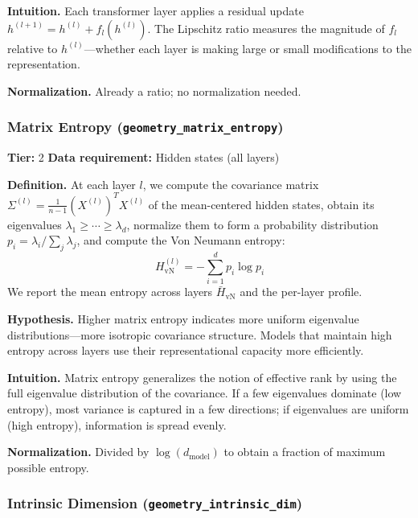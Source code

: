 \documentclass{article}
\begin{document}
\textbf{Intuition.}
Each transformer layer applies a residual update $h^{(l+1)} = h^{(l)} + f_l(h^{(l)})$. The Lipschitz ratio measures the magnitude of $f_l$ relative to $h^{(l)}$---whether each layer is making large or small modifications to the representation.

\textbf{Normalization.} Already a ratio; no normalization needed.

\subsubsection{Matrix Entropy (\texttt{geometry\_matrix\_entropy})}
\label{app:matrix-entropy}

\textbf{Tier:} 2 \quad \textbf{Data requirement:} Hidden states (all layers)

\textbf{Definition.}
At each layer $l$, we compute the covariance matrix $\Sigma^{(l)} = \frac{1}{n-1}(X^{(l)})^T X^{(l)}$ of the mean-centered hidden states, obtain its eigenvalues $\lambda_1 \geq \cdots \geq \lambda_d$, normalize them to form a probability distribution $p_i = \lambda_i / \sum_j \lambda_j$, and compute the Von Neumann entropy:
\begin{equation}
  H_{\text{vN}}^{(l)} = -\sum_{i=1}^{d} p_i \log p_i
\end{equation}
We report the mean entropy across layers $\bar{H}_{\text{vN}}$ and the per-layer profile.

\textbf{Hypothesis.}
Higher matrix entropy indicates more uniform eigenvalue distributions---more isotropic covariance structure. Models that maintain high entropy across layers use their representational capacity more efficiently.

\textbf{Intuition.}
Matrix entropy generalizes the notion of effective rank by using the full eigenvalue distribution of the covariance. If a few eigenvalues dominate (low entropy), most variance is captured in a few directions; if eigenvalues are uniform (high entropy), information is spread evenly.

\textbf{Normalization.} Divided by $\log(d_{\text{model}})$ to obtain a fraction of maximum possible entropy.

\subsubsection{Intrinsic Dimension (\texttt{geometry\_intrinsic\_dim})}
\label{app:intrinsic-dim}
\end{document}
